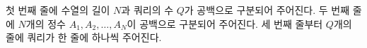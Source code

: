 첫 번째 줄에 수열의 길이 $N$과 쿼리의 수 $Q$가 공백으로 구분되어 주어진다.
두 번째 줄에 $N$개의 정수 $A_1,A_2,\dots,A_N$이 공백으로 구분되어 주어진다.
세 번째 줄부터 $Q$개의 줄에 쿼리가 한 줄에 하나씩 주어진다.
